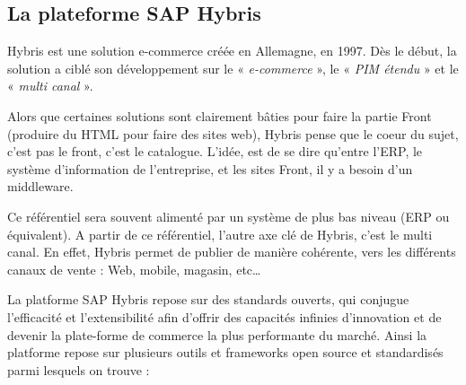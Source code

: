 \subsection{La plateforme SAP Hybris}

Hybris est une solution e-commerce créée en Allemagne, en 1997. Dès le début, la solution a ciblé son développement sur le « \textit{e-commerce} », le « \textit{PIM étendu} » et le « \textit{multi canal} »\cite{wiki:hybris}.


\medskip

Alors que certaines solutions sont clairement bâties pour faire la partie Front (produire du HTML pour faire des sites web), Hybris pense que le coeur du sujet, c’est pas le front, c’est le catalogue. L’idée, est de se dire qu’entre l’ERP, le système d’information de l’entreprise, et les sites Front, il y a besoin d’un middleware\cite{wiki:hybris}.
\medskip

Ce référentiel sera souvent alimenté par un système de plus bas niveau (ERP ou équivalent). A partir de ce référentiel, l’autre axe clé de Hybris, c’est le multi canal. En effet, Hybris permet de publier de manière cohérente, vers les différents canaux de vente : Web, mobile, magasin, etc…
\medskip

La platforme SAP Hybris repose sur des standards ouverts, qui conjugue l’efficacité et l’extensibilité afin d’offrir des capacités infinies d’innovation et de devenir la plate-forme de commerce la plus performante du marché. Ainsi la platforme repose sur plusieurs outils et frameworks open source et standardisés parmi lesquels on trouve :

